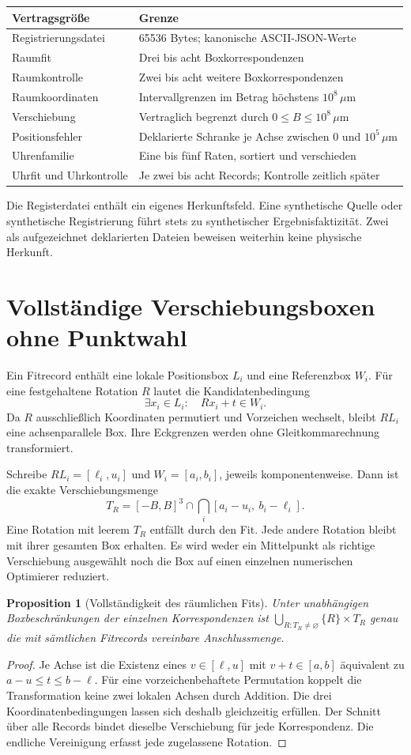 \documentclass[11pt,a4paper]{article}
\newcommand{\nextsection}[2]{\clearpage{\color{accent}\small\textsf{#1}}\section{#2}}
\newtheorem{proposition}{Proposition}[section]
\begin{document}
\begin{tabularx}{\linewidth}{@{}lY@{}}\toprule
Vertragsgröße & Grenze\\\midrule
Registrierungsdatei & 65536 Bytes; kanonische ASCII-JSON-Werte\\
Raumfit & Drei bis acht Boxkorrespondenzen\\
Raumkontrolle & Zwei bis acht weitere Boxkorrespondenzen\\
Raumkoordinaten & Intervallgrenzen im Betrag höchstens $10^8\,\mu$m\\
Verschiebung & Vertraglich begrenzt durch $0\leq B\leq10^8\,\mu$m\\
Positionsfehler & Deklarierte Schranke je Achse zwischen 0 und $10^5\,\mu$m\\
Uhrenfamilie & Eine bis fünf Raten, sortiert und verschieden\\
Uhrfit und Uhrkontrolle & Je zwei bis acht Records; Kontrolle zeitlich später\\\bottomrule
\end{tabularx}

Die Registerdatei enthält ein eigenes Herkunftsfeld. Eine
synthetische Quelle oder synthetische Registrierung führt stets
zu synthetischer Ergebnisfaktizität. Zwei als aufgezeichnet deklarierten
Dateien beweisen weiterhin keine physische Herkunft.

\nextsection{91 / RÄUMLICHER FIT}{Vollständige Verschiebungsboxen ohne Punktwahl}
Ein Fitrecord enthält eine lokale Positionsbox $L_i$ und eine
Referenzbox $W_i$. Für eine festgehaltene Rotation $R$ lautet die
Kandidatenbedingung
\[
 \exists x_i\in L_i:\quad Rx_i+t\in W_i.
\]
Da $R$ ausschließlich Koordinaten permutiert und Vorzeichen
wechselt, bleibt $R L_i$ eine achsenparallele Box. Ihre Eckgrenzen
werden ohne Gleitkommarechnung transformiert.

Schreibe $R L_i=[\ell_i,u_i]$ und $W_i=[a_i,b_i]$, jeweils
komponentenweise. Dann ist die exakte Verschiebungsmenge
\[
 T_R=[-B,B]^3\cap\bigcap_i[a_i-u_i,\ b_i-\ell_i].
\]
Eine Rotation mit leerem $T_R$ entfällt durch den Fit. Jede andere
Rotation bleibt mit ihrer gesamten Box erhalten. Es wird weder ein
Mittelpunkt als richtige Verschiebung ausgewählt noch die Box auf
einen einzelnen numerischen Optimierer reduziert.

\begin{proposition}[Vollständigkeit des räumlichen Fits]
Unter unabhängigen Boxbeschränkungen der einzelnen Korrespondenzen
ist $\bigcup_{R:T_R\ne\varnothing}\{R\}\times T_R$ genau die
mit sämtlichen Fitrecords vereinbare Anschlussmenge.
\end{proposition}
\begin{proof}
Je Achse ist die Existenz eines $v\in[\ell,u]$ mit
$v+t\in[a,b]$ äquivalent zu $a-u\leq t\leq b-\ell$.
Für eine vorzeichenbehaftete Permutation koppelt die Transformation
keine zwei lokalen Achsen durch Addition. Die drei Koordinatenbedingungen
lassen sich deshalb gleichzeitig erfüllen. Der Schnitt über alle
Records bindet dieselbe Verschiebung für jede Korrespondenz.
Die endliche Vereinigung erfasst jede zugelassene Rotation.
\end{proof}
\end{document}
